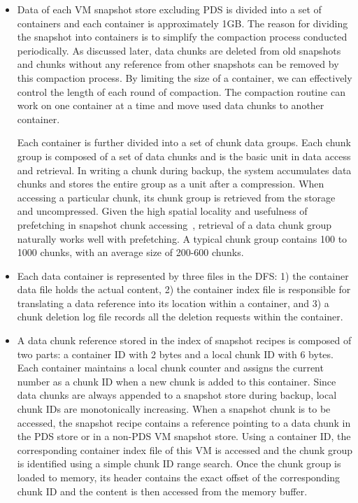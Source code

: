 \begin{itemize}
\item Data of each VM snapshot store excluding PDS is divided into a set of containers and 
each container is approximately 1GB. 
The reason for dividing the snapshot into containers is to simplify the compaction process
conducted periodically. As discussed later, data chunks are deleted from old snapshots
and chunks without any reference from other snapshots can be removed by this compaction process.
By limiting the size of a container, we can effectively control the length of each round of compaction.
The compaction  routine can work on one container at a time and move used data chunks to another container. 

Each container is further divided into a set of chunk data groups. Each chunk group is composed of
a set of data chunks and is the basic unit in data access and retrieval. 
In writing a chunk during backup, the system accumulates data chunks and stores the entire
group as a unit after a compression.
When accessing a particular chunk, its chunk group is retrieved from the storage
and uncompressed. Given the high spatial locality and usefulness of prefetching  in 
snapshot chunk accessing~\cite{Guo2011,foundation08},
retrieval of  a data chunk  group naturally works well with prefetching. 
A  typical chunk group contains 100 to 1000 chunks, with an average size of 
200-600 chunks.

\item Each data container is represented by three files in the DFS:
1) the container data file holds the actual content, 
2) the container index file is responsible for translating a data reference
into its location within a container, and 
3) a chunk deletion log file records all the deletion requests within  the container.

\item A data chunk reference stored in the index of snapshot recipes
is composed of two parts: a container ID with 2 bytes and a local chunk ID with 6 bytes.
Each container maintains a local  chunk counter and assigns the current number 
as a chunk ID  when  a new chunk is added to this  container. 
Since data chunks are always appended to a snapshot store during backup, 
local chunk IDs are monotonically increasing.
When a snapshot chunk is to be accessed, the snapshot recipe contains a reference pointing to  a data chunk
in the PDS store or in a non-PDS VM snapshot  store. 
Using  a container ID, the corresponding container index file of this VM is accessed and 
the chunk group is identified using a simple chunk ID range search. Once the chunk group is loaded to memory, 
its header contains the exact offset of the corresponding chunk ID and the content is then accessed from the memory buffer.


\end{itemize}

